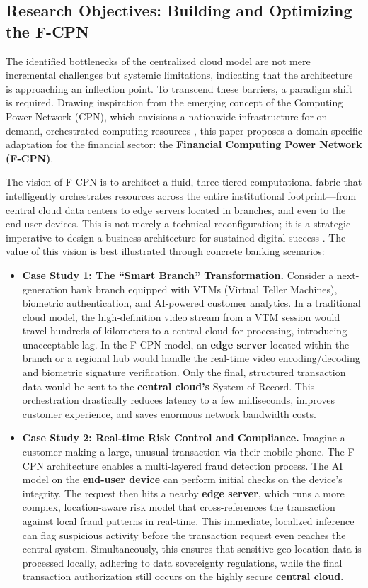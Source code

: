 \documentclass[11pt,a4paper]{article}
\begin{document}
\subsection{Research Objectives: Building and Optimizing the F-CPN}

The identified bottlenecks of the centralized cloud model are not mere incremental challenges but systemic limitations, indicating that the architecture is approaching an inflection point. To transcend these barriers, a paradigm shift is required. Drawing inspiration from the emerging concept of the Computing Power Network (CPN), which envisions a nationwide infrastructure for on-demand, orchestrated computing resources \cite{liu2023computing}, this paper proposes a domain-specific adaptation for the financial sector: the \textbf{Financial Computing Power Network (F-CPN)}.

The vision of F-CPN is to architect a fluid, three-tiered computational fabric that intelligently orchestrates resources across the entire institutional footprint---from central cloud data centers to edge servers located in branches, and even to the end-user devices. This is not merely a technical reconfiguration; it is a strategic imperative to design a business architecture for sustained digital success \cite{ross2019designed}. The value of this vision is best illustrated through concrete banking scenarios:

\begin{itemize}
  \item \textbf{Case Study 1: The ``Smart Branch'' Transformation.} Consider a next-generation bank branch equipped with VTMs (Virtual Teller Machines), biometric authentication, and AI-powered customer analytics. In a traditional cloud model, the high-definition video stream from a VTM session would travel hundreds of kilometers to a central cloud for processing, introducing unacceptable lag. In the F-CPN model, an \textbf{edge server} located within the branch or a regional hub would handle the real-time video encoding/decoding and biometric signature verification. Only the final, structured transaction data would be sent to the \textbf{central cloud's} System of Record. This orchestration drastically reduces latency to a few milliseconds, improves customer experience, and saves enormous network bandwidth costs.
  \item \textbf{Case Study 2: Real-time Risk Control and Compliance.} Imagine a customer making a large, unusual transaction via their mobile phone. The F-CPN architecture enables a multi-layered fraud detection process. The AI model on the \textbf{end-user device} can perform initial checks on the device's integrity. The request then hits a nearby \textbf{edge server}, which runs a more complex, location-aware risk model that cross-references the transaction against local fraud patterns in real-time. This immediate, localized inference can flag suspicious activity before the transaction request even reaches the central system. Simultaneously, this ensures that sensitive geo-location data is processed locally, adhering to data sovereignty regulations, while the final transaction authorization still occurs on the highly secure \textbf{central cloud}.
\end{itemize}
\end{document}
